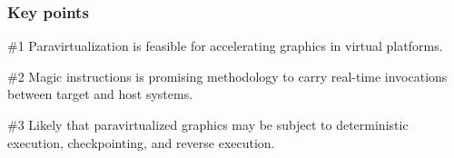 \begin{frame}
\frametitle{Key points}

\begin{block}{\#1}
	Paravirtualization is feasible for accelerating graphics in virtual platforms.
\end{block}

\begin{block}{\#2}
	Magic instructions is promising methodology to carry real-time invocations between target and host systems.
\end{block}

\begin{block}{\#3}
	Likely that paravirtualized graphics may be subject to deterministic execution, checkpointing, and reverse execution.
\end{block}

\end{frame}
